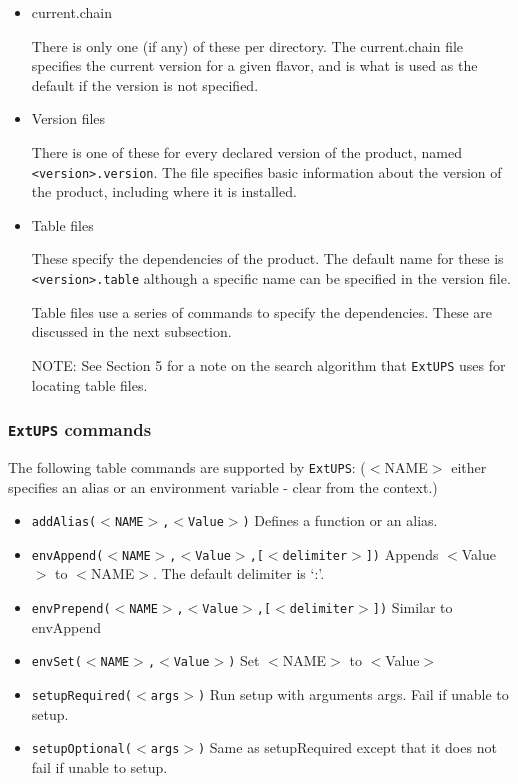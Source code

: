 \documentclass{article}
\newcommand{\code}[1]{\texttt{#1}}
\newcommand{\file}[1]{\texttt{#1}}
\newcommand{\eups}{\code{ExtUPS}}
\begin{document}
\begin{itemize}
  \item current.chain

    There is only one (if any) of these per directory.  The
    current.chain file specifies the current version for a given
    flavor, and is what is used as the default if the version is not
    specified.

  \item Version files

    There is one of these for every declared version of the product,
    named \file{<version>.version}. The file specifies basic information
    about the version of the product, including where it is installed.

  \item Table files

    These specify the dependencies of the product. The default name
    for these is \file{<version>.table} although a specific name can be specified in the
    version file.

    Table files use a series of commands to specify the dependencies. These are
    discussed in the next subsection.

    NOTE: See Section 5 for a note on the search algorithm that \eups{} uses for 
    locating table files.
\end{itemize}

\subsubsection{\eups{} commands}

The following table commands are supported by \eups{}: ($<$NAME$>$ either specifies an
alias or an environment variable - clear from the context.)

\begin{itemize}
   \item \code{addAlias($<$NAME$>$,$<$Value$>$)}
     Defines a function or an alias.
    
   \item \code{envAppend($<$NAME$>$,$<$Value$>$,[$<$delimiter$>$])}
     Appends $<$Value$>$ to $<$NAME$>$. The default delimiter is `:'.
     
   \item \code{envPrepend($<$NAME$>$,$<$Value$>$,[$<$delimiter$>$])}
     Similar to envAppend
     
   \item \code{envSet($<$NAME$>$,$<$Value$>$)}
     Set $<$NAME$>$ to $<$Value$>$
     
   \item \code{setupRequired($<$args$>$)}
     Run setup with arguments args. Fail if unable to setup.
     
   \item \code{setupOptional($<$args$>$)}
     Same as setupRequired except that it does not fail if unable to setup.
\end{itemize}
\end{document}
